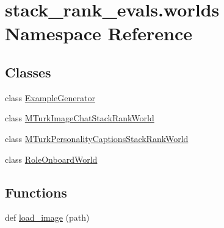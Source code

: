 \hypertarget{namespacestack__rank__evals_1_1worlds}{}\section{stack\+\_\+rank\+\_\+evals.\+worlds Namespace Reference}
\label{namespacestack__rank__evals_1_1worlds}
\subsection*{Classes}
\begin{DoxyCompactItemize}
\item 
class \hyperlink{classstack__rank__evals_1_1worlds_1_1ExampleGenerator}{Example\+Generator}
\item 
class \hyperlink{classstack__rank__evals_1_1worlds_1_1MTurkImageChatStackRankWorld}{M\+Turk\+Image\+Chat\+Stack\+Rank\+World}
\item 
class \hyperlink{classstack__rank__evals_1_1worlds_1_1MTurkPersonalityCaptionsStackRankWorld}{M\+Turk\+Personality\+Captions\+Stack\+Rank\+World}
\item 
class \hyperlink{classstack__rank__evals_1_1worlds_1_1RoleOnboardWorld}{Role\+Onboard\+World}
\end{DoxyCompactItemize}
\subsection*{Functions}
\begin{DoxyCompactItemize}
\item 
def \hyperlink{namespacestack__rank__evals_1_1worlds_a0174c3e372a345f192cef824e4c5528d}{load\+\_\+image} (path)
\end{DoxyCompactItemize}
